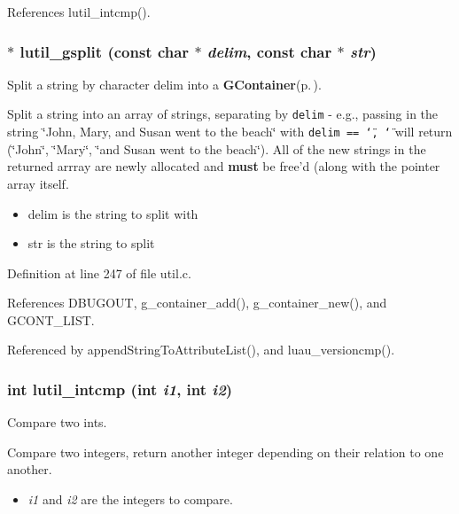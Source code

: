 References lutil\_\-intcmp().
\subsubsection{$\ast$ lutil\_\-gsplit (const char $\ast$ {\em delim}, const char $\ast$ {\em str})}\label{util_8h_a16}


Split a string by character delim into a {\bf GContainer}{\rm (p.\,\pageref{structGContainer})}. 

Split a string into an array of strings, separating by {\tt delim} - e.g., passing in the string \char`\"{}John, Mary, and Susan went to the beach\char`\"{} with {\tt delim == \char`\"{}, \char`\"{}} will return (\char`\"{}John\char`\"{}, \char`\"{}Mary\char`\"{}, \char`\"{}and Susan went to the beach\char`\"{}). All of the new strings in the returned arrray are newly allocated and {\bf must} be free'd (along with the pointer array itself.

\begin{itemize}
\item delim is the string to split with \item str is the string to split 
\end{itemize}


Definition at line 247 of file util.c.

References DBUGOUT, g\_\-container\_\-add(), g\_\-container\_\-new(), and GCONT\_\-LIST.

Referenced by append\-String\-To\-Attribute\-List(), and luau\_\-versioncmp().
\subsubsection{\setlength{\rightskip}{0pt plus 5cm}int lutil\_\-intcmp (int {\em i1}, int {\em i2})}\label{util_8h_a30}


Compare two ints. 

Compare two integers, return another integer depending on their relation to one another.

\begin{itemize}
\item {\em i1\/} and {\em i2\/} are the integers to compare. 
\end{itemize}


